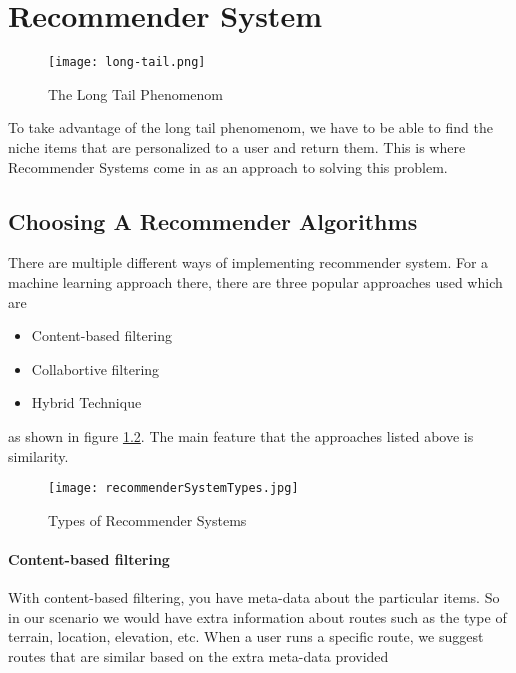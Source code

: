 \chapter{Recommender System} \label{chap:Recommender}

\begin{figure}[ht]
    \centering
    \texttt{[image: long-tail.png]}
    \caption{The Long Tail Phenomenom}
    \label{fig:longTail}
\end{figure}

To take advantage of the long tail phenomenom, we have to be able to find the niche items that are personalized to a user and return them. This is where Recommender Systems come in as an approach to solving this problem.

\section{Choosing A Recommender Algorithms} \label{chooseRecAlg}
There are multiple different ways of implementing recommender system. For a machine learning approach there, there are three popular approaches used which are
\begin{itemize}
    \item Content-based filtering
    \item Collabortive filtering
    \item Hybrid Technique
\end{itemize}
as shown in figure \ref{fig:recommenderSystemTypes}. The main feature that the approaches listed above is similarity.

\begin{figure}[ht]
    \centering
    \texttt{[image: recommenderSystemTypes.jpg]}
    \caption{Types of Recommender Systems}
    \label{fig:recommenderSystemTypes}
\end{figure}

\subsubsection{Content-based filtering}
With content-based filtering, you have meta-data about the particular items. So in our scenario we would have extra information about routes such as the type of terrain, location, elevation, etc. When a user runs a specific route, we suggest routes that are similar based on the extra meta-data provided

